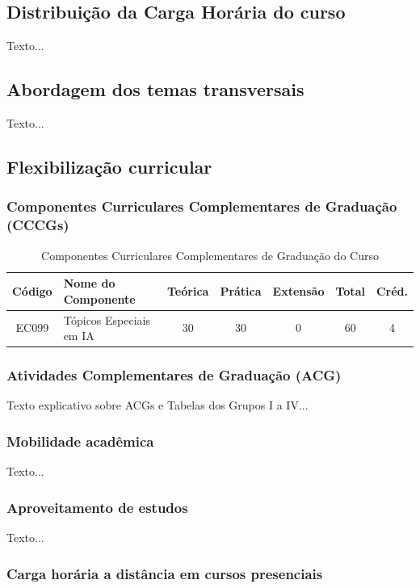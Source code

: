 \subsection{Distribuição da Carga Horária do curso}
Texto...

\subsection{Abordagem dos temas transversais}
Texto...

\subsection{Flexibilização curricular}

\subsubsection{Componentes Curriculares Complementares de Graduação (CCCGs)}
\begin{table}[htb]
\centering
\caption{Componentes Curriculares Complementares de Graduação do Curso}
\label{tab:cccg}
\begin{tabular}{|c|l|c|c|c|c|c|}
\hline
\textbf{Código} & \textbf{Nome do Componente} & \textbf{Teórica} & \textbf{Prática} & \textbf{Extensão} & \textbf{Total} & \textbf{Créd.} \\ \hline
EC099 & Tópicos Especiais em IA & 30 & 30 & 0 & 60 & 4 \\ \hline
\end{tabular}
\end{table}

\subsubsection{Atividades Complementares de Graduação (ACG)}
Texto explicativo sobre ACGs e Tabelas dos Grupos I a IV...

\subsubsection{Mobilidade acadêmica}
Texto...

\subsubsection{Aproveitamento de estudos}
Texto...

\subsubsection{Carga horária a distância em cursos presenciais}
